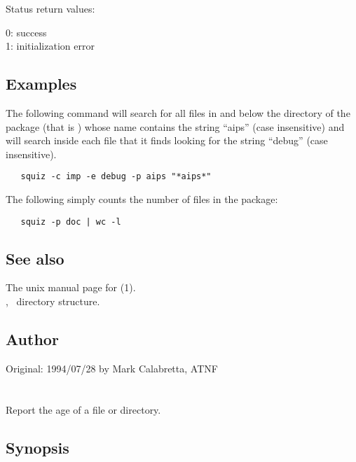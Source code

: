 Status return values:
\begin{status}
   0:  success\\
   1:  initialization error
\end{status}

\subsection*{Examples}

The following command will search for all files in and below the
 directory of the  package (that is
) whose name contains the string ``aips'' (case
insensitive) and will search inside each file that it finds looking for the
string ``debug'' (case insensitive).

\begin{verbatim}
   squiz -c imp -e debug -p aips "*aips*"
\end{verbatim}

\noindent
The following simply counts the number of files in the  package:

\begin{verbatim}
   squiz -p doc | wc -l
\end{verbatim}

\subsection*{See also}

The unix manual page for (1).\\
, \aipspp\ directory structure.

\subsection*{Author}

Original: 1994/07/28 by Mark Calabretta, ATNF


\newpage
\section{}
\label{tract}

Report the age of a file or directory.

\subsection*{Synopsis}

